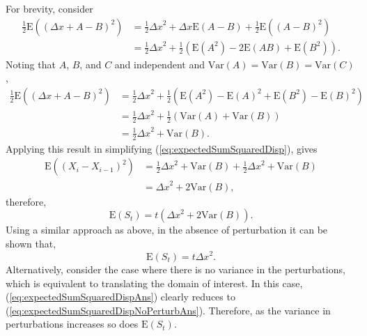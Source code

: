 \documentclass[11pt,titlepage,a4paper]{article}
\begin{document}
			For brevity, consider
			\begin{align*}
			\frac{1}{2} \mathrm{E} \left(\left(\Delta x + A - B \right)^2 \right) &= \frac{1}{2} {\Delta x}^2 + \Delta x \mathrm{E} \left (A - B \right) + \frac{1}{2} \mathrm {E} \left( \left(A - B \right)^2 \right) \\
			&= \frac{1}{2} {\Delta x}^2 + \frac{1}{2} \left(\mathrm{E} \left(A^2 \right) - 2 \mathrm{E} \left(AB \right) + \mathrm{E} \left(B^2 \right) \right).
			\end{align*}
			Noting that $A$, $B$, and $C$ and independent and $\mathrm{Var} \left(A \right) = \mathrm{Var} \left(B \right) = \mathrm{Var} \left(C \right)$,
			\begin{align*}
			\frac{1}{2} \mathrm{E} \left(\left(\Delta x + A - B \right)^2 \right) &= \frac{1}{2} {\Delta x}^2 + \frac{1}{2} \left(\mathrm{E} \left(A^2 \right) - \mathrm{E} \left(A \right)^2 + \mathrm{E} \left(B^2 \right) - \mathrm{E} \left(B \right)^2 \right) \\
			&= \frac{1}{2} {\Delta x}^2 + \frac{1}{2} \left(\mathrm{Var} \left(A \right) + \mathrm{Var} \left(B \right) \right) \\
			&= \frac{1}{2} {\Delta x}^2 + \mathrm{Var} \left(B \right).
			\end{align*}
			Applying this result in simplifying (\ref{eq:expectedSumSquaredDisp}), gives
			\begin{align*}
				\mathrm{E} \left( \left(X_i - X_{i-1} \right)^2 \right) &= \frac{1}{2} {\Delta x}^2 + \mathrm{Var} \left(B \right) + \frac{1}{2} {\Delta x}^2 + \mathrm{Var} \left(B \right) \\
				&= {\Delta x}^2 + 2 \mathrm{Var} \left(B \right),
			\end{align*}
			therefore,
			\begin{equation}
				\label{eq:expectedSumSquaredDispAns}
				\mathrm{E} \left(S_t \right) = t \left({\Delta x}^2 + 2 \mathrm{Var} \left(B \right) \right).
			\end{equation}
			Using a similar approach as above, in the absence of perturbation it can be shown that, 
			\begin{equation}
				\label{eq:expectedSumSquaredDispNoPerturbAns}
				\mathrm{E} \left(S_t \right) = t {\Delta x}^2.
			\end{equation}
			Alternatively, consider the case where there is no variance in the perturbations, which is equivalent to translating the domain of interest. In this case, (\ref{eq:expectedSumSquaredDispAns}) clearly reduces to (\ref{eq:expectedSumSquaredDispNoPerturbAns}). Therefore, as the variance in perturbations increases so does $\mathrm{E} \left(S_t \right)$.
\end{document}
